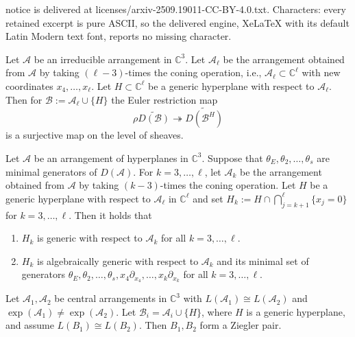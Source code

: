 \documentclass[10pt,a4paper]{amsart}
\def\A{{\mathcal{A}}}%
\def\B{{\mathcal{B}}}%
\def\CC{{\mathbb{C}}}%
\begin{document}
notice is delivered at licenses/arxiv-2509.19011-CC-BY-4.0.txt. Characters: every retained excerpt is pure ASCII, so the delivered engine, XeLaTeX with its default Latin Modern text font, reports no missing character.
\begin{lemma}\label{lem:surjectivity}
	Let $\A$ be an irreducible arrangement in $\CC^3$. Let $\A_\ell$ be the arrangement obtained from $\A$ by taking $(\ell-3)$-times the coning operation, i.e., $\A_\ell \subset \CC^\ell$ with new coordinates $x_4,\ldots,x_\ell$.
	Let $H\subset \CC^\ell$ be a generic hyperplane with respect to $\A_\ell$.
	Then for $\B:=\A_\ell \cup \{H\}$ the Euler restriction map
	\[
	\rho \widetilde{D(\B)} \twoheadrightarrow \widetilde{D(\B^H)}
	\]
	is a surjective map on the level of sheaves.
\end{lemma}

\begin{cor}\label{cor:generic}
	Let $\mathcal{A}$ be an arrangement of hyperplanes in $\CC^3$.
	Suppose that $\theta_E,\theta_2,\ldots,\theta_s$ are minimal generators of $D(\A)$.
	For $k=3,\dots,\ell$, let $\A_k$ be the arrangement obtained from $\A$ by taking $(k-3)$-times the coning operation.
	Let $H$ be a generic hyperplane with respect to $\A_\ell$ in $\mathbb{C}^\ell$ and set $H_k:= H \cap \bigcap_{j=k+1}^{\ell} \{x_j=0\}$ for $k=3,\dots,\ell$.
	Then it holds that
		\begin{enumerate}
			\item[(i)] $H_k$ is generic with respect to $\A_k$ for all $k=3,\dots,\ell$.
			\item[(ii)] $H_k$ is algebraically generic with respect to $\A_k$ and its minimal set of generators $\theta_E,\theta_2,\dots,\theta_s,x_4\partial_{x_4},\dots,x_k \partial_{x_k}$ for all $k=3,\dots,\ell$.
		\end{enumerate}
\end{cor}

\begin{theorem}\label{main}
Let \(\mathcal{A}_1,\mathcal{A}_2\) be central arrangements in \(\mathbb C^3\) with
\(L(\mathcal{A}_1)\cong L(\mathcal{A}_2)\) and \(\exp(\mathcal{A}_1)\ne \exp(\mathcal{A}_2)\).
Let \(\mathcal{B}_i=\mathcal{A}_i\cup\{H\}\), where \(H\) is a generic hyperplane, and assume \(L(B_1)\cong L(B_2)\). Then \(B_1,B_2\) form a Ziegler pair.
\end{theorem}
\end{document}
